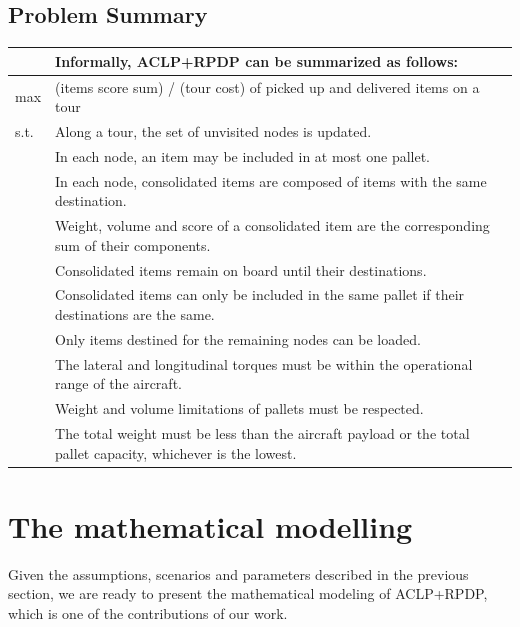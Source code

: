 \documentclass[preprint,authoryear]{elsarticle}
\begin{document}
\subsection{Problem Summary}


\bgroup
\def\arraystretch{1.2}
\begin{table}[H]
	\centering
	\small
	\begin{tabular}{MT}
		&Informally, ACLP+RPDP can be summarized as follows:\\
		\midrule
		max &  (items score sum) / (tour cost) of picked up and delivered items on a tour  \\
		\midrule
s.t.    & Along a tour, the set of unvisited nodes is updated. \\
		& In each node, an item may be included in at most one pallet.\\		
		& In each node, consolidated items are composed of items with the same destination. \\
		& Weight, volume and score of a consolidated item are the corresponding sum of their components.\\
		& Consolidated items remain on board until their destinations.\\	
		& Consolidated items can only be included in the same pallet if their destinations are the same.\\
		& Only items destined for the remaining nodes can be loaded.  \\
		& The lateral and longitudinal torques must be within the operational range of the aircraft.\\
		& Weight and volume limitations of pallets must be respected.\\
		& The total weight must be less than the aircraft payload or the total pallet capacity, whichever is the lowest.\\	
		\midrule
	\end{tabular}
	\normalsize
\end{table}
\egroup 



\section{The mathematical modelling}
\label{sec4}

Given the assumptions, scenarios and parameters described in the previous section, we are ready to present the mathematical modeling of ACLP+RPDP, which is one of the contributions of our work.
\end{document}

